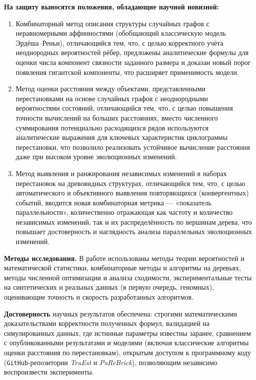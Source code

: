 \textbf{На защиту выносятся положения, обладающие научной новизной:}
\begin{enumerate}[label={\arabic*.}]
    \item Комбинаторный метод описания структуры случайных графов с неравномерными аффинностями (обобщающий классическую модель Эрдёша--Реньи), отличающийся тем, что, с целью корректного учёта неоднородных вероятностей рёбер, предложены аналитические формулы для оценки числа компонент связности заданного размера и доказан новый порог появления гигантской компоненты, что расширяет применимость модели.
    \item Метод оценки расстояния между объектами, представленными перестановками на основе случайных графов с неоднородными вероятностями состояний, отличающийся тем, что, с целью повышения точности вычислений на больших расстояниях, вместо численного суммирования потенциально расходящихся рядов используются аналитические выражения для ключевых характеристик циклограммы перестановки, что позволило реализовать устойчивое вычисление расстояния даже при высоком уровне эволюционных изменений.
    \item Метод выявления и ранжирования независимых изменений в наборах перестановок на древовидных структурах, отличающийся тем, что, с целью автоматического и объективного выявления повторяющихся (конвергентных) событий, вводится новая комбинаторная метрика — «показатель параллельности», количественно отражающая как частоту и количество независимых изменений, так и их распределённость по вершинам дерева, что повышает достоверность и наглядность анализа параллельных эволюционных изменений.
\end{enumerate}

\textbf{Методы исследования.} 
В работе использованы методы теории вероятностей и математической статистики, комбинаторные методы и алгоритмы на деревьях, методы численной оптимизации и анализа сходимости, экспериментальные тесты на синтетических и реальных данных (в первую очередь, геномных), оценивающие точность и скорость разработанных алгоритмов.

\textbf{Достоверность} научных результатов обеспечена: строгими математическими доказательствами корректности полученных формул, валидацией на симулированных данных, где истинные параметры известны заранее, сравнением с опубликованными результатами и моделями (включая классические алгоритмы оценки расстояния по перестановкам), открытым доступом к программному коду (\texttt{GitHub}-репозитории \emph{TruEst} и \emph{PaReBrick}), позволяющим независимо воспроизвести эксперименты.

